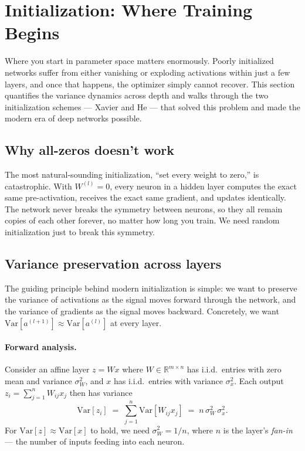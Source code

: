 \documentclass[11pt, a4paper]{article}
\let\oldsection\section
\renewcommand{\section}{\clearpage\oldsection}
\newcommand{\R}{\mathbb{R}}
\begin{document}
\section{Initialization: Where Training Begins}
\label{sec:init}

Where you start in parameter space matters enormously. Poorly initialized networks suffer from either vanishing or exploding activations within just a few layers, and once that happens, the optimizer simply cannot recover. This section quantifies the variance dynamics across depth and walks through the two initialization schemes --- Xavier and He --- that solved this problem and made the modern era of deep networks possible.

\subsection{Why all-zeros doesn't work}

The most natural-sounding initialization, ``set every weight to zero,'' is catastrophic. With $W^{(l)} = 0$, every neuron in a hidden layer computes the exact same pre-activation, receives the exact same gradient, and updates identically. The network never breaks the symmetry between neurons, so they all remain copies of each other forever, no matter how long you train. We need random initialization just to break this symmetry.

\subsection{Variance preservation across layers}

The guiding principle behind modern initialization is simple: we want to preserve the variance of activations as the signal moves forward through the network, and the variance of gradients as the signal moves backward. Concretely, we want $\mathrm{Var}[a^{(l+1)}] \approx \mathrm{Var}[a^{(l)}]$ at every layer.

\paragraph{Forward analysis.} Consider an affine layer $z = Wx$ where $W \in \R^{m \times n}$ has i.i.d.\ entries with zero mean and variance $\sigma_W^2$, and $x$ has i.i.d.\ entries with variance $\sigma_x^2$. Each output $z_i = \sum_{j=1}^n W_{ij} x_j$ then has variance
\begin{equation}
    \mathrm{Var}[z_i] \;=\; \sum_{j=1}^n \mathrm{Var}[W_{ij} x_j] \;=\; n\,\sigma_W^2\,\sigma_x^2.
\end{equation}
For $\mathrm{Var}[z] \approx \mathrm{Var}[x]$ to hold, we need $\sigma_W^2 = 1/n$, where $n$ is the layer's \emph{fan-in} --- the number of inputs feeding into each neuron.
\end{document}
